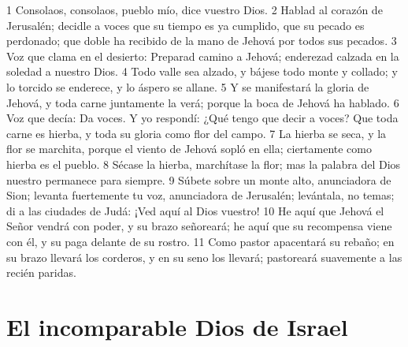 1 Consolaos, consolaos, pueblo mío, dice vuestro Dios.
2 Hablad al corazón de Jerusalén; decidle a voces que su tiempo es ya cumplido, que su pecado es perdonado; que doble ha recibido de la mano de Jehová por todos sus pecados.
3 Voz que clama en el desierto: Preparad camino a Jehová; enderezad calzada en la soledad a nuestro Dios. 
4 Todo valle sea alzado, y bájese todo monte y collado; y lo torcido se enderece, y lo áspero se allane.
5 Y se manifestará la gloria de Jehová, y toda carne juntamente la verá; porque la boca de Jehová ha hablado. 
6 Voz que decía: Da voces. Y yo respondí: ¿Qué tengo que decir a voces? Que toda carne es hierba, y toda su gloria como flor del campo.
7 La hierba se seca, y la flor se marchita, porque el viento de Jehová sopló en ella; ciertamente como hierba es el pueblo.
8 Sécase la hierba, marchítase la flor; mas la palabra del Dios nuestro permanece para siempre. 
9 Súbete sobre un monte alto, anunciadora de Sion; levanta fuertemente tu voz, anunciadora de Jerusalén; levántala, no temas; di a las ciudades de Judá: ¡Ved aquí al Dios vuestro!
10 He aquí que Jehová el Señor vendrá con poder, y su brazo señoreará; he aquí que su recompensa viene con él, y su paga delante de su rostro. 
11 Como pastor apacentará su rebaño; en su brazo llevará los corderos, y en su seno los llevará; pastoreará suavemente a las recién paridas.

\section*{El incomparable Dios de Israel}

